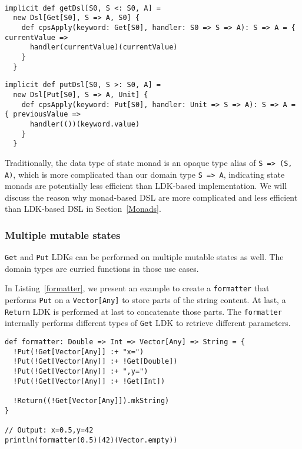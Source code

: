 \begin{lstlisting}[caption={The \lstinline{Dsl} instance for \lstinline{Get} LDK},label={getDsl}]

implicit def getDsl[S0, S <: S0, A] =
  new Dsl[Get[S0], S => A, S0] {
    def cpsApply(keyword: Get[S0], handler: S0 => S => A): S => A = { currentValue =>
      handler(currentValue)(currentValue)
    }
  }
\end{lstlisting}

\begin{lstlisting}[caption={The \lstinline{Dsl} instance for \lstinline{Put} LDK},label={putDsl}]
implicit def putDsl[S0, S >: S0, A] =
  new Dsl[Put[S0], S => A, Unit] {
    def cpsApply(keyword: Put[S0], handler: Unit => S => A): S => A = { previousValue =>
      handler(())(keyword.value)
    }
  }
\end{lstlisting}

Traditionally, the data type of state monad is an opaque type alias of \lstinline{S => (S, A)}, which is more complicated than our domain type \lstinline{S => A}, indicating state monads are potentially less efficient than LDK-based implementation. We will discuss the reason why monad-based DSL are more complicated and less efficient than LDK-based DSL in Section~\ref{Monads}.

\subsubsection{Multiple mutable states}\label{Multiple mutable states}

\lstinline{Get} and \lstinline{Put} LDKs can be performed on multiple mutable states as well. The domain types are curried functions in those use cases.

In Listing~\ref{formatter}, we present an example to create a \lstinline{formatter} that performs \lstinline{Put} on a \lstinline{Vector[Any]} to store parts of the string content. At last, a \lstinline{Return} LDK is performed at last to concatenate those parts. The \lstinline{formatter} internally performs different types of \lstinline{Get} LDK to retrieve different parameters.

\begin{lstlisting}[caption={Using \lstinline{Get} and \lstinline{Put} in a curried function},label={formatter}]
def formatter: Double => Int => Vector[Any] => String = {
  !Put(!Get[Vector[Any]] :+ "x=")
  !Put(!Get[Vector[Any]] :+ !Get[Double])
  !Put(!Get[Vector[Any]] :+ ",y=")
  !Put(!Get[Vector[Any]] :+ !Get[Int])

  !Return((!Get[Vector[Any]]).mkString)
}

// Output: x=0.5,y=42
println(formatter(0.5)(42)(Vector.empty))
\end{lstlisting}


